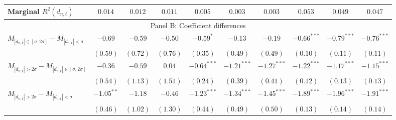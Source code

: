 \begin{tabular}{lccccccccc}
  Marginal $R^2(d_{n,t})$ & $0.014$ & $0.012$ & $0.011$ & $0.005$ & $0.003$ & $0.003$ & $0.053$ & $0.049$ & $0.047$ \\ 
   \hline \multicolumn{10}{c}{Panel B: Coefficient differences} \\
 \hline$M_{|d_{n,t}| \in [\sigma, 2\sigma]} - M_{|d_{n,t}| < \sigma}$ & $-0.69$ & $-0.59$ & $-0.50$ & $-0.59^{*}$ & $-0.13$ & $-0.19$ & $-0.66^{***}$ & $-0.79^{***}$ & $-0.76^{***}$ \\ 
   & $(0.59)$ & $(0.72)$ & $(0.76)$ & $(0.35)$ & $(0.49)$ & $(0.49)$ & $(0.10)$ & $(0.11)$ & $(0.11)$ \\ 
  $M_{|d_{n,t}| > 2 \sigma} - M_{|d_{n,t}| \in [\sigma, 2\sigma]}$ & $-0.36$ & $-0.59$ & $0.04$ & $-0.64^{***}$ & $-1.21^{***}$ & $-1.27^{***}$ & $-1.22^{***}$ & $-1.17^{***}$ & $-1.15^{***}$ \\ 
   & $(0.54)$ & $(1.13)$ & $(1.51)$ & $(0.24)$ & $(0.39)$ & $(0.41)$ & $(0.12)$ & $(0.13)$ & $(0.13)$ \\ 
  $M_{|d_{n,t}| > 2 \sigma} - M_{|d_{n,t}| < \sigma}$ & $-1.05^{**}$ & $-1.18$ & $-0.46$ & $-1.23^{***}$ & $-1.34^{***}$ & $-1.45^{***}$ & $-1.89^{***}$ & $-1.96^{***}$ & $-1.91^{***}$ \\ 
   & $(0.46)$ & $(1.02)$ & $(1.30)$ & $(0.44)$ & $(0.49)$ & $(0.50)$ & $(0.13)$ & $(0.14)$ & $(0.14)$ \\ 
   \hline 
\end{tabular}
